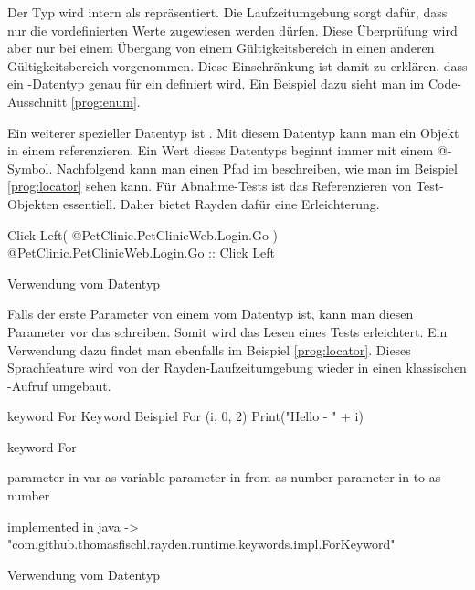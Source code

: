 \SuperPar
Der Typ  wird intern als  repräsentiert. Die Laufzeitumgebung sorgt dafür, dass nur die vordefinierten Werte zugewiesen werden dürfen. Diese Überprüfung wird aber nur bei einem Übergang von einem Gültigkeitsbereich in einen anderen Gültigkeitsbereich vorgenommen. Diese Einschränkung ist damit zu erklären, dass ein -Datentyp genau für ein  definiert wird. Ein Beispiel dazu sieht man im Code-Ausschnitt \ref{prog:enum}.  

\SuperPar
Ein weiterer spezieller Datentyp ist . Mit diesem Datentyp kann man ein Objekt in einem  referenzieren. Ein Wert dieses Datentyps beginnt immer mit einem @-Symbol. Nachfolgend kann man einen Pfad im  beschreiben, wie man im Beispiel \ref{prog:locator} sehen kann. Für Abnahme-Tests ist das Referenzieren von Test-Objekten essentiell. Daher bietet Rayden dafür eine Erleichterung. 

\begin{program}
\begin{JavaCode}
Click Left( @PetClinic.PetClinicWeb.Login.Go )
@PetClinic.PetClinicWeb.Login.Go :: Click Left
\end{JavaCode}
\caption{Verwendung vom Datentyp }
\label{prog:locator}
\end{program}

\SuperPar
Falls der erste Parameter von einem  vom Datentyp  ist, kann man diesen Parameter vor das  schreiben. Somit wird das Lesen eines Tests erleichtert. Ein Verwendung dazu findet man ebenfalls im Beispiel \ref{prog:locator}. Dieses Sprachfeature wird von der Rayden-Laufzeitumgebung wieder in einen klassischen -Aufruf umgebaut.

\begin{program}
\begin{JavaCode}

keyword For Keyword Beispiel{
	For (i, 0, 2){
		Print("Hello - " + i)
	}
}

keyword For { 
	parameter in var as variable
	parameter in from as number
	parameter in to as number

	implemented in java -> "com.github.thomasfischl.rayden.runtime.keywords.impl.ForKeyword"
}
\end{JavaCode}
\caption{Verwendung vom Datentyp }
\label{prog:variable}
\end{program}

